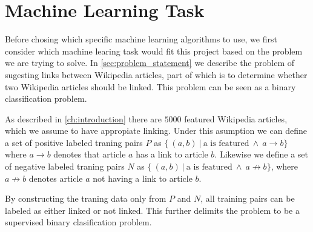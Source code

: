 

\section{Machine Learning Task}\label{sec:machine_learning_task}
Before chosing which specific machine learning algorithms to use, we first consider which machine learing task would fit this project based on the problem we are trying to solve. In \cref{sec:problem_statement} we describe the problem of sugesting links between Wikipedia articles, part of which is to determine whether two Wikipedia articles should be linked. This problem can be seen as a binary classification problem.

As described in \cref{ch:introduction} there are $5000$ featured Wikipedia articles, which we assume to have appropiate linking. Under this asumption we can define a set of positive labeled traning pairs $P$ as $\{\ (a,b)\ |\ \text{a is featured}\ \wedge\ a \to b \}$ where $a \to b$ denotes that article $a$ has a link to article $b$. Likewise we define a set of negative labeled traning pairs $N$ as  $\{\ (a,b)\ |\ \text{a is featured}\ \wedge\ a \not\to b \}$, where $a \not\to b$ denotes article $a$ not having a link to article $b$.

By constructing the traning data only from $P$ and $N$, all training pairs can be labeled as either linked or not linked. This further delimits the problem to be a supervised binary clasification problem.
